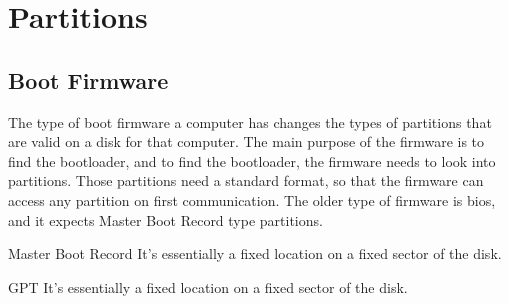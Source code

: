 \documentclass[openany, 12pt]{book}
\begin{document}
\chapter{Partitions}
\section{Boot Firmware}
The type of boot firmware a computer has changes the types of partitions that
are valid on a disk for that computer.  The main purpose of the firmware is to
find the bootloader, and to find the bootloader, the firmware needs to look into
partitions.  Those partitions need a standard format, so that the firmware can
access any partition on first communication. The older type of firmware is bios,
and it expects Master Boot Record type partitions.

\begin{definition}{Master Boot Record}{}
	It's essentially a fixed location on a fixed sector of the disk.
\end{definition}

\begin{definition}{GPT}{}
	It's essentially a fixed location on a fixed sector of the disk.
\end{definition}
\end{document}
